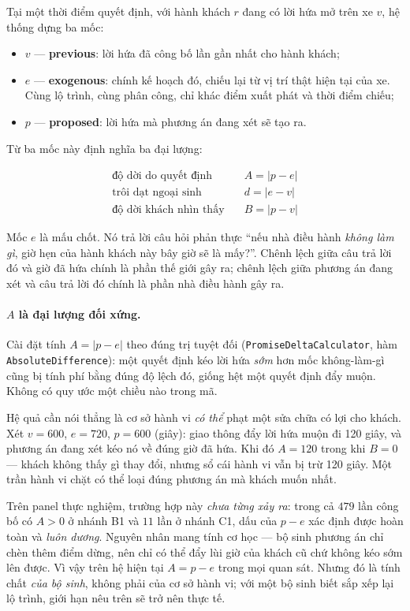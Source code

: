 Tại một thời điểm quyết định, với hành khách $r$ đang có lời hứa mở trên xe $v$, hệ thống dựng
ba mốc:

\begin{itemize}[leftmargin=1.2cm,itemsep=2pt,topsep=3pt]
\item $v$ --- \textbf{previous}: lời hứa đã công bố lần gần nhất cho hành khách;
\item $e$ --- \textbf{exogenous}: chính kế hoạch đó, chiếu lại từ vị trí thật hiện tại của xe.
Cùng lộ trình, cùng phân công, chỉ khác điểm xuất phát và thời điểm chiếu;
\item $p$ --- \textbf{proposed}: lời hứa mà phương án đang xét sẽ tạo ra.
\end{itemize}

Từ ba mốc này định nghĩa ba đại lượng:

\begin{align}
\text{độ dời do quyết định} \quad & A = |p - e|\\
\text{trôi dạt ngoại sinh} \quad & d = |e - v|\\
\text{độ dời khách nhìn thấy} \quad & B = |p - v|
\end{align}

Mốc $e$ là mấu chốt. Nó trả lời câu hỏi phản thực ``nếu nhà điều hành \emph{không làm gì}, giờ
hẹn của hành khách này bây giờ sẽ là mấy?''. Chênh lệch giữa câu trả lời đó và giờ đã hứa chính
là phần thế giới gây ra; chênh lệch giữa phương án đang xét và câu trả lời đó chính là phần nhà
điều hành gây ra.

\paragraph{$A$ là đại lượng đối xứng.} Cài đặt tính $A = |p - e|$ theo đúng trị tuyệt đối
(\texttt{PromiseDeltaCalculator}, hàm \texttt{AbsoluteDifference}): một quyết định kéo lời hứa
\emph{sớm} hơn mốc không-làm-gì cũng bị tính phí bằng đúng độ lệch đó, giống hệt một quyết định
đẩy muộn. Không có quy ước một chiều nào trong mã.

Hệ quả cần nói thẳng là cơ sở hành vi \emph{có thể} phạt một sửa chữa có lợi cho khách. Xét
$v = 600$, $e = 720$, $p = 600$ (giây): giao thông đẩy lời hứa muộn đi 120 giây, và phương án
đang xét kéo nó về đúng giờ đã hứa. Khi đó $A = 120$ trong khi $B = 0$ --- khách không thấy gì
thay đổi, nhưng sổ cái hành vi vẫn bị trừ 120 giây. Một trần hành vi chặt có thể loại đúng phương
án mà khách muốn nhất.

Trên panel thực nghiệm, trường hợp này \emph{chưa từng xảy ra}: trong cả $479$ lần công bố có
$A > 0$ ở nhánh B1 và $11$ lần ở nhánh C1, dấu của $p - e$ xác định được hoàn toàn và
\emph{luôn dương}. Nguyên nhân mang tính cơ học --- bộ sinh phương án chỉ chèn thêm điểm dừng,
nên chỉ có thể đẩy lùi giờ của khách cũ chứ không kéo sớm lên được. Vì vậy trên hệ hiện tại
$A = p - e$ trong mọi quan sát. Nhưng đó là tính chất \emph{của bộ sinh}, không phải của cơ sở
hành vi; với một bộ sinh biết sắp xếp lại lộ trình, giới hạn nêu trên sẽ trở nên thực tế.

